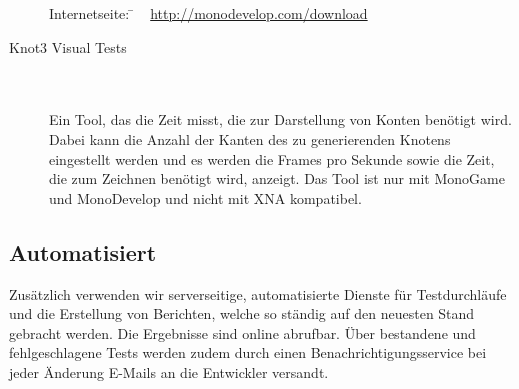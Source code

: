 \begin{description}
	\begin{tabbing}
		Internetseite:
		\= ~ \href {http://monodevelop.com/download}
	    	       {http://monodevelop.com/download}
	    \\
	\end{tabbing}
	
	\item[Knot3 Visual Tests]\hfill
	\\
	\\
	Ein Tool, das die Zeit misst, die zur Darstellung von Konten benötigt wird. Dabei kann die Anzahl der Kanten des zu generierenden Knotens eingestellt werden
	und es werden die Frames pro Sekunde sowie die Zeit, die zum Zeichnen benötigt wird, anzeigt. Das Tool ist nur mit MonoGame und MonoDevelop und nicht mit XNA kompatibel.
	
\end{description}



\clearpage




\subsection{Automatisiert}
\label{Abschnitt:Tests:Werkzeuge:Automatisiert}

Zusätzlich verwenden wir serverseitige, automatisierte Dienste für Testdurchläufe und die Erstellung von Berichten, welche so ständig auf den neuesten Stand gebracht werden. Die Ergebnisse sind online abrufbar. Über bestandene und fehlgeschlagene Tests werden zudem durch einen Benachrichtigungsservice bei jeder Änderung E-Mails an die Entwickler versandt.
\\
\\


